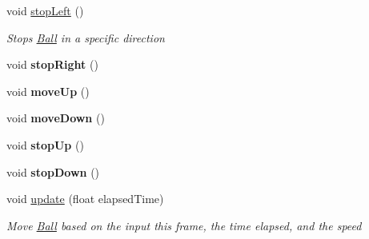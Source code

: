 \begin{DoxyCompactItemize}
void \mbox{\hyperlink{class_ball_ab19bf068b3ea5b9468479478880f0831}{stop\+Left}} ()
\begin{DoxyCompactList}\small\item\em Stops \mbox{\hyperlink{class_ball}{Ball}} in a specific direction \end{DoxyCompactList}\item 
\mbox{\label{class_ball_a72be807ae8f2b1fb4c97eec8d82dad58}} 
void {\bfseries stop\+Right} ()
\item 
\mbox{\label{class_ball_afb36e5574f9fe428048bb8b09506cb72}} 
void {\bfseries move\+Up} ()
\item 
\mbox{\label{class_ball_a097ca955e51c809a7b7486ec7f68bcd8}} 
void {\bfseries move\+Down} ()
\item 
\mbox{\label{class_ball_a68b3312ba4684a43b6da8ec157a2e025}} 
void {\bfseries stop\+Up} ()
\item 
\mbox{\label{class_ball_ad4e5bdbb2d363f3db190cd4f506b3758}} 
void {\bfseries stop\+Down} ()
\item 
void \mbox{\hyperlink{class_ball_abedf04351568d8ae5859c15726eee558}{update}} (float elapsed\+Time)
\begin{DoxyCompactList}\small\item\em Move \mbox{\hyperlink{class_ball}{Ball}} based on the input this frame, the time elapsed, and the speed \end{DoxyCompactList}\end{DoxyCompactItemize}
